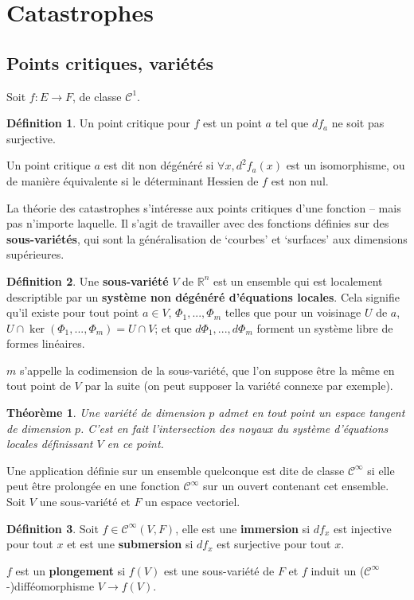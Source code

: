 \documentclass{article}
\newcommand{\cun}{\mathcal{C}^1}
\newcommand{\cinf}{\mathcal{C}^\infty}
\newcommand{\R}{\mathbb{R}}
\newtheorem{thm}{Théorème}
\theoremstyle{definition}
\newtheorem{defn}{Définition}
\begin{document}
\section{Catastrophes}

\subsection{Points critiques, variétés}

Soit $f:E\to F$, de classe $\cun$.
\begin{defn}
	Un point critique pour $f$ est un point $a$ tel que $df_a$ ne soit pas surjective.

	Un point critique $a$ est dit non dégénéré si $\forall x, d^2f_a(x)$ est un isomorphisme, ou de manière équivalente si le déterminant Hessien de $f$ est non nul.
\end{defn}

La théorie des catastrophes s'intéresse aux points critiques d'une fonction -- mais pas n'importe laquelle.
Il s'agit de travailler avec des fonctions définies sur des \textbf{sous-variétés}, qui sont la généralisation de `courbes' et `surfaces' aux dimensions supérieures.

\begin{defn}
	Une \textbf{sous-variété} $V$ de $\R^n$ est un ensemble qui est localement descriptible par un \textbf{système non dégénéré d'équations locales}.
	Cela signifie qu'il existe pour tout point $a\in V$, $\Phi_1,...,\Phi_m$ telles que pour un voisinage $U$ de $a$, $U\cap\ker(\Phi_1,...,\Phi_m)=U\cap V$; et que $d\Phi_1,...,d\Phi_m$ forment un système libre de formes linéaires.

	$m$ s'appelle la codimension de la sous-variété, que l'on suppose être la même en tout point de $V$ par la suite (on peut supposer la variété connexe par exemple).
\end{defn}

\begin{thm}
	Une variété de dimension $p$ admet en tout point un espace tangent de dimension $p$.
	C'est en fait l'intersection des noyaux du système d'équations locales définissant $V$ en ce point.
\end{thm}

Une application définie sur un ensemble quelconque est dite de classe $\cinf$ si elle peut être prolongée en une fonction $\cinf$ sur un ouvert contenant cet ensemble. Soit $V$ une sous-variété et $F$ un espace vectoriel.

\begin{defn}
	Soit $f\in\cinf(V,F)$, elle est une \textbf{immersion} si $df_x$ est injective pour tout $x$ et est une \textbf{submersion} si $df_x$ est surjective pour tout $x$.

	$f$ est un \textbf{plongement} si $f(V)$ est une sous-variété de $F$ et $f$ induit un ($\cinf$-)difféomorphisme $V\to f(V)$.
\end{defn}
\end{document}
